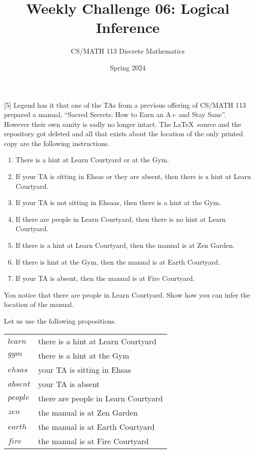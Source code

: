 \documentclass[a4paper]{exam}
\title{Weekly Challenge 06: Logical Inference}
\author{CS/MATH 113 Discrete Mathematics}
\date{Spring 2024}
\begin{document}
\maketitle

\begin{questions}

  [5] Legend has it that one of the TAs from a previous offering of CS/MATH 113 prepared a manual, ``Sacred Secrets: How to Earn an A+ and Stay Sane''. However their own sanity is sadly no longer intact. The \LaTeX\ source and the repository got deleted and all that exists about the location of the only printed copy are the following instructions.
  \begin{enumerate}
  \item There is a hint at Learn Courtyard or at the Gym.
  \item If your TA is sitting in Ehsas or they are absent, then there is a hint at Learn Courtyard.
  \item If your TA is not sitting in Ehsaas, then there is a hint at the Gym.
  \item If there are people in Learn Courtyard, then there is no hint at Learn Courtyard.
  \item If there is a hint at Learn Courtyard, then the manual is at Zen Garden.
  \item If there is hint at the Gym, then the manual is at Earth Courtyard.
  \item If your TA is absent, then the manual is at Fire Courtyard.
  \end{enumerate}
  You notice that there are people in Learn Courtyard. Show how you can infer the location of the manual.

  \begin{solution}
    Let us use the following propositions.\\
    \begin{tabular}{l@{ : }l}
      $learn$ & there is a hint at Learn Courtyard\\
      $gym$ & there is a hint at the Gym\\
      $ehsas$ & your TA is sitting in Ehsas\\
      $absent$ & your TA is absent\\
      $people$ & there are people in Learn Courtyard\\
      $zen$ & the manual is at Zen Garden\\
      $earth$ & the manual is at Earth Courtyard\\
      $fire$ & the manual is at Fire Courtyard
    \end{tabular}


\end{solution}
\end{questions}
\end{document}
